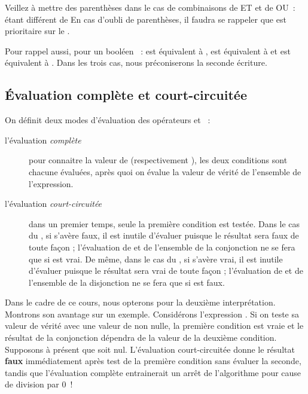 			Veillez à mettre des parenthèses dans le cas de combinaisons de ET et de
			OU~:  étant différent de
			 En cas
			d’oubli de parenthèses, il faudra se rappeler que
			 est prioritaire sur le .
			
			Pour rappel aussi, pour un booléen ~: 
			 est équivalent à ,
			 est équivalent à  et 
			 est équivalent à .
			Dans les trois cas, nous préconiserons la seconde écriture.
	
		\subsection{Évaluation complète et court-circuitée}
	
			On définit deux modes d’évaluation des opérateurs 
			et ~:
	
			\begin{description}
			\item[l’évaluation \textit{complète}]
				pour connaitre la valeur de
				 (respectivement
				), les deux conditions sont chacune
				évaluées, après quoi on évalue la valeur de vérité de l’ensemble de
				l’expression.
			\item[l’évaluation \textit{court-circuitée}]
				dans un premier temps, seule la
				première condition est testée. Dans le cas du ,
				si  s’avère faux, il est inutile d’évaluer
				 puisque le résultat sera faux de toute façon
				; l’évaluation de  et de l’ensemble de la
				conjonction ne se fera que si  est vrai. De
				même, dans le cas du , si
				 s’avère vrai, il est inutile d’évaluer
				 puisque le résultat sera vrai de toute façon
				; l’évaluation de  et de l’ensemble de la
				disjonction ne se fera que si  est faux.
			\end{description}
	
			Dans le cadre de ce cours, nous opterons pour la deuxième 
			interprétation.
			Montrons son avantage sur un exemple.
			Considérons	l’expression 
			\textstyleCodeInsr{${\neq}$}. Si on teste sa valeur de vérité avec une
			valeur de  non nulle, la première condition est
			vraie et le résultat de la conjonction dépendra de la valeur de la
			deuxième condition. Supposons à présent que  soit
			nul. L’évaluation court-circuitée donne le résultat \textbf{faux}
			immédiatement après test de la première condition sans évaluer la
			seconde, tandis que l’évaluation complète entrainerait un arrêt de
			l’algorithme pour cause de division par 0~!
	
